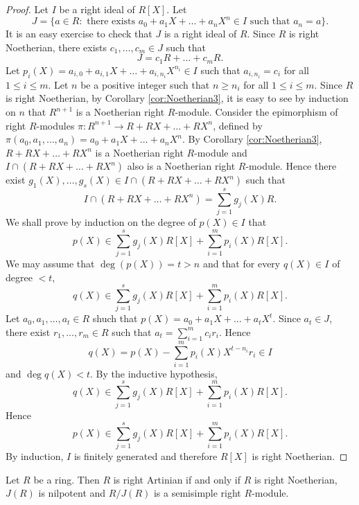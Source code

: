 \begin{proof}
Let $I$ be a right ideal of $R[X]$. Let
\[J=\{ a\in R : \text{ there exists }a_0+a_1X+\dots +a_nX^n\in I\text{ such that }a_n=a\}.\]
It is an easy exercise to check that $J$ is a right ideal of $R$. Since $R$ is right Noetherian, there exists $c_1,\dots ,c_m\in J$ such that 
\[ J=c_1R+\dots +c_mR.\]
Let $p_{i}(X)=a_{i,0}+a_{i,1}X+\dots +a_{i,n_i}X^{n_i}\in I$ such that $a_{i,n_i}=c_i$ for all $1\leq i\leq m$. Let $n$ be a positive integer such that $n\geq n_i$ for all $1\leq i\leq m$. Since $R$ is right Noetherian, by Corollary \ref{cor:Noetherian3}, it is easy to see by induction on $n$ that $R^{n+1}$ is a Noetherian right $R$-module. Consider the epimorphism of right $R$-modules
$\pi\colon R^{n+1}\rightarrow R+RX+\dots +RX^n$, defined by $\pi(a_0,a_1,\dots ,a_n)=a_0+a_1X+\dots +a_nX^n$. By Corollary \ref{cor:Noetherian3}, $R+RX+\dots +RX^n$ is a Noetherian right $R$-module and $I\cap (R+RX+\dots +RX^n)$ also is a Noetherian right $R$-module. Hence there exist $g_1(X),\dots ,g_s(X)\in I\cap (R+RX+\dots +RX^n)$ such that
\[I\cap (R+RX+\dots +RX^n)=\sum_{j=1}^sg_j(X)R.\]
We shall prove by induction on the degree of $p(X)\in I$ that
\[ p(X)\in \sum_{j=1}^sg_j(X)R[X]+\sum_{i=1}^mp_i(X)R[X].\]
We may assume that $\deg(p(X))=t>n$ and that for every $q(X)\in I$ of degree $<t$,
\[ q(X)\in \sum_{j=1}^sg_j(X)R[X]+\sum_{i=1}^mp_i(X)R[X].\]
Let $a_0,a_1,\dots ,a_t\in R$ shuch that $p(X)=a_0+a_1X+\dots +a_tX^t$. Since $a_t\in J$, there exist $r_1,\dots ,r_m\in R$ such that $a_t=\sum_{i=1}^mc_ir_i$. Hence
\[ q(X)=p(X)-\sum_{i=1}^m p_i(X)X^{t-n_i}r_i\in I\]
and $\deg{q(X)}<t$. By the inductive hypothesis,
\[ q(X)\in \sum_{j=1}^sg_j(X)R[X]+\sum_{i=1}^mp_i(X)R[X].\]
Hence
\[ p(X)\in \sum_{j=1}^sg_j(X)R[X]+\sum_{i=1}^mp_i(X)R[X].\]
By induction, $I$ is finitely generated and therefore $R[X]$ is right Noetherian.
\end{proof}

\begin{theorem}
Let $R$ be a ring. Then $R$ is right Artinian if and only if $R$ is right Noetherian, $J(R)$ is nilpotent and $R/J(R)$ is a semisimple right $R$-module.
\end{theorem}

